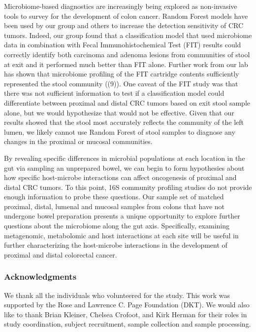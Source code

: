 \documentclass[11pt,]{article}
\begin{document}
Microbiome-based diagnostics are increasingly being explored as
non-invasive tools to survey for the development of colon cancer. Random
Forest models have been used by our group and others to increase the
detection sensitivity of CRC tumors. Indeed, our group found that a
classification model that used microbiome data in combination with Fecal
Immunohistochemical Test (FIT) results could correctly identify both
carcinoma and adenoma lesions from communities of stool at exit and it
performed much better than FIT alone. Further work from our lab has
shown that microbiome profiling of the FIT cartridge contents
sufficiently represented the stool community ((9)). One caveat of the
FIT study was that there was not sufficient information to test if a
classification model could differentiate between proximal and distal CRC
tumors based on exit stool sample alone, but we would hypothesize that
would not be effective. Given that our results showed that the stool
most accurately reflects the community of the left lumen, we likely
cannot use Random Forest of stool samples to diagnose any changes in the
proximal or mucosal communities.

By revealing specific differences in microbial populations at each
location in the gut via sampling an unprepared bowel, we can begin to
form hypothesies about how specific host-microbe interactions can affect
oncogenesis of proximal and distal CRC tumors. To this point, 16S
community profiling studies do not provide enough information to probe
these questions. Our sample set of matched proximal, distal, lumenal and
mucosal samples from colons that have not undergone bowel preparation
presents a unique opportunity to explore further questions about the
microbiome along the gut axis. Specifically, examining metagenomic,
metabolomic and host interactions at each site will be useful in further
characterizing the host-microbe interactions in the development of
proximal and distal colorectal cancer.

\subsubsection{Acknowledgments}\label{acknowledgments}

We thank all the individuals who volunteered for the study. This work
was supported by the Rose and Lawrence C. Page Foundation (DKT). We
would also like to thank Brian Kleiner, Chelsea Crofoot, and Kirk Herman
for their roles in study coordination, subject recruitment, sample
collection and sample processing.
\end{document}
